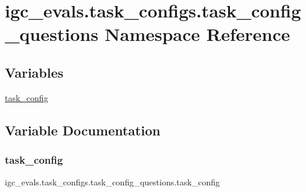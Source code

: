 \hypertarget{namespaceigc__evals_1_1task__configs_1_1task__config__questions}{}\section{igc\+\_\+evals.\+task\+\_\+configs.\+task\+\_\+config\+\_\+questions Namespace Reference}
\label{namespaceigc__evals_1_1task__configs_1_1task__config__questions}
\subsection*{Variables}
\begin{DoxyCompactItemize}
\item 
\hyperlink{namespaceigc__evals_1_1task__configs_1_1task__config__questions_a38150718703071fdb0df9c348899e842}{task\+\_\+config}
\end{DoxyCompactItemize}


\subsection{Variable Documentation}
\mbox{\label{namespaceigc__evals_1_1task__configs_1_1task__config__questions_a38150718703071fdb0df9c348899e842}} 
\subsubsection{\texorpdfstring{task\+\_\+config}{task\_config}}
{\footnotesize\ttfamily igc\+\_\+evals.\+task\+\_\+configs.\+task\+\_\+config\+\_\+questions.\+task\+\_\+config}

